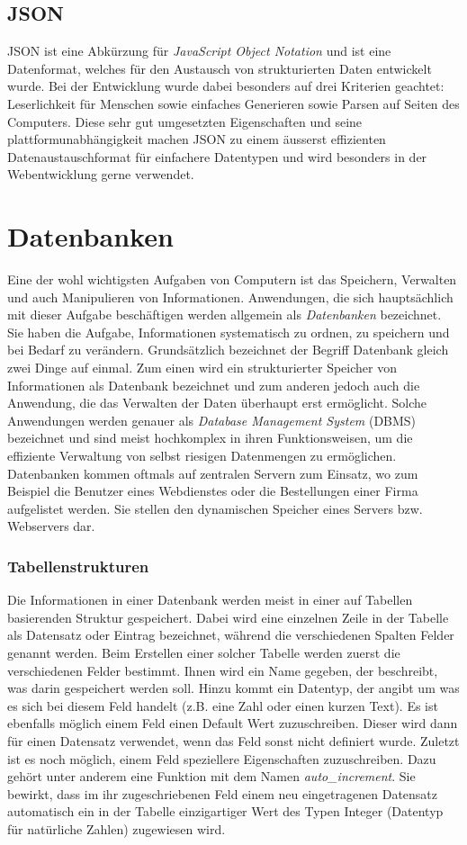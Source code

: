 \documentclass[../main.tex]{subfiles}
\begin{document}
	\subsection{JSON}
	JSON ist eine Abkürzung für \emph{JavaScript Object Notation} und ist eine Datenformat, welches für den Austausch von strukturierten Daten entwickelt wurde. Bei der Entwicklung wurde dabei besonders auf drei Kriterien geachtet: Leserlichkeit für Menschen sowie einfaches Generieren sowie Parsen auf Seiten des Computers. Diese sehr gut umgesetzten Eigenschaften und seine plattformunabhängigkeit  machen JSON zu einem äusserst effizienten Datenaustauschformat für einfachere Datentypen und wird besonders in der Webentwicklung gerne verwendet. \cite{JSON}
	
	\section{Datenbanken} \label{Datenbanken}
	Eine der wohl wichtigsten Aufgaben von Computern ist das Speichern, Verwalten und auch Manipulieren von Informationen. Anwendungen, die sich hauptsächlich mit dieser Aufgabe beschäftigen werden allgemein als \emph{Datenbanken} bezeichnet. Sie haben die Aufgabe, Informationen systematisch zu ordnen, zu speichern und bei Bedarf zu verändern. Grundsätzlich bezeichnet der Begriff Datenbank gleich zwei Dinge auf einmal. Zum einen wird ein strukturierter Speicher von Informationen als Datenbank bezeichnet und zum anderen jedoch auch die Anwendung, die das Verwalten der Daten überhaupt erst ermöglicht. Solche Anwendungen werden genauer als \emph{Database Management System} (DBMS) bezeichnet und sind meist hochkomplex in ihren Funktionsweisen, um die effiziente Verwaltung von selbst riesigen Datenmengen zu ermöglichen. \cite{IT-Handbuch} Datenbanken kommen oftmals auf zentralen Servern zum Einsatz, wo zum Beispiel die Benutzer eines Webdienstes oder die Bestellungen einer Firma aufgelistet werden. Sie stellen den dynamischen Speicher eines Servers bzw. Webservers dar.
	
	\subsubsection*{Tabellenstrukturen}
	Die Informationen in einer Datenbank werden meist in einer auf Tabellen basierenden Struktur gespeichert. Dabei wird eine einzelnen Zeile in der Tabelle als Datensatz oder Eintrag bezeichnet, während die verschiedenen Spalten Felder genannt werden. Beim Erstellen einer solcher Tabelle werden zuerst die verschiedenen Felder bestimmt. Ihnen wird ein Name gegeben, der beschreibt, was darin gespeichert werden soll. Hinzu kommt ein Datentyp, der angibt um was es sich bei diesem Feld handelt (z.B. eine Zahl oder einen kurzen Text). Es ist ebenfalls möglich einem Feld einen Default Wert zuzuschreiben. Dieser wird dann für einen Datensatz verwendet, wenn das Feld sonst nicht definiert wurde. Zuletzt ist es noch möglich, einem Feld speziellere Eigenschaften zuzuschreiben. Dazu gehört unter anderem eine Funktion mit dem Namen \emph{auto\_increment}. Sie bewirkt, dass im ihr zugeschriebenen Feld einem neu eingetragenen Datensatz automatisch ein in der Tabelle einzigartiger Wert des Typen Integer (Datentyp für natürliche Zahlen) zugewiesen wird.
	
\end{document}
